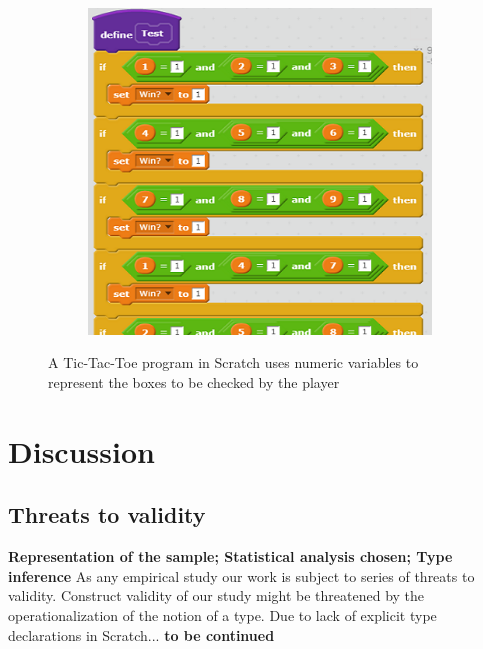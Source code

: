 \documentclass[conference]{IEEEtran}
\newcommand{\todo}[1]{ \textbf{#1} }
\begin{document}
\begin{figure}[!h]
\begin{subfigure}{.5\columnwidth}
	\end{subfigure}\hfil%
	\begin{subfigure}{.5\columnwidth}
		\includegraphics[width=\columnwidth]{fig/tic_3}%
	\end{subfigure}%
\caption{A Tic-Tac-Toe program in Scratch uses numeric variables to represent the boxes to be checked by the player}
\label{"fig:tictactoe_example"}
\end{figure}


 \section{Discussion}
\subsection{Threats to validity}
\todo{Representation of the sample; Statistical analysis chosen; Type inference}
As any empirical study our work is subject to series of threats to validity.
Construct validity of our study might be threatened by the operationalization of the notion of a type. 
Due to lack of explicit type declarations in Scratch...
\todo{to be continued}
\end{document}
